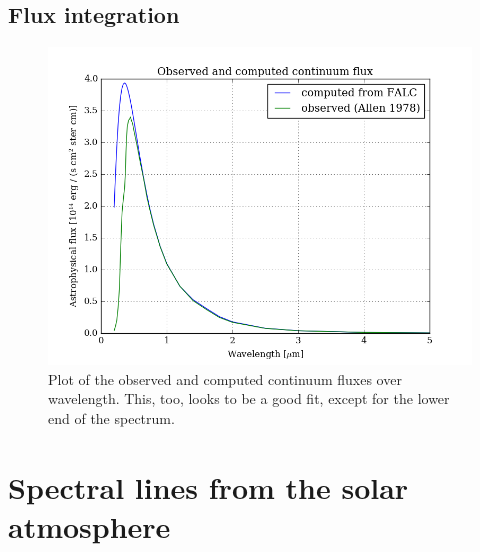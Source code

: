 \documentclass[11pt,a4paper,notitlepage]{article}
\begin{document}
\subsection{Flux integration}

\begin{figure}[H]
\center
	\includegraphics[scale=0.42]{../figs/2flux.png}
	\caption{Plot of the observed and computed continuum fluxes over wavelength. This, too, looks to be a good fit, except for the lower end of the spectrum.}
\end{figure}


\section{Spectral lines from the solar atmosphere} 						%
\end{document}
